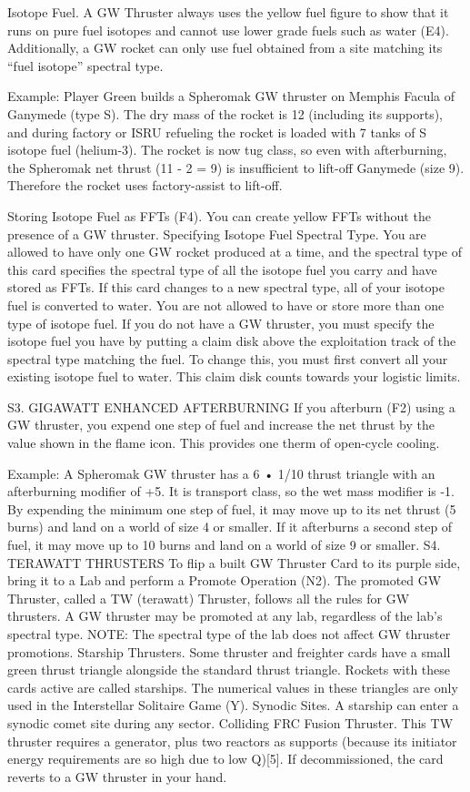 \documentclass[a4paper]{book}
\begin{document}
Isotope Fuel. A GW Thruster always uses the yellow fuel figure to show that it runs on pure fuel isotopes and cannot use lower grade fuels such as water (E4). Additionally, a GW rocket can only use fuel obtained from a site matching its “fuel isotope” spectral type.

Example: Player Green builds a Spheromak GW thruster on Memphis Facula of Ganymede (type S). The dry mass of the rocket is 12 (including its supports), and during factory or ISRU refueling the rocket is loaded with 7 tanks of S isotope fuel (helium-3). The rocket is now tug class, so even with afterburning, the Spheromak net thrust (11 - 2 = 9) is insufficient to lift-off Ganymede (size 9). Therefore the rocket uses factory-assist to lift-off.

 Storing Isotope Fuel as FFTs  (F4). You can create yellow FFTs without the presence of a GW thruster.
Specifying Isotope Fuel Spectral Type. You are allowed to have only one GW rocket produced at a time, and the spectral type of this card specifies the spectral type of all the isotope fuel you carry and have stored as FFTs. If this card changes to a new spectral type, all of your isotope fuel is converted to water. You are not allowed to have or store more than one type of isotope fuel. If you do not have a GW thruster, you must specify the isotope fuel you have by putting a claim disk above the exploitation track of the spectral type matching the fuel. To change this, you must first convert all your existing isotope fuel to water. This claim disk counts towards your logistic limits.
 
S3. GIGAWATT ENHANCED AFTERBURNING
If you afterburn (F2) using a GW thruster, you expend one step of fuel and increase the net thrust by the value shown in the flame icon. This provides one therm of open-cycle cooling.

Example: A Spheromak GW thruster has a 6 • 1/10 thrust triangle with an afterburning modifier of +5. It is transport class, so the wet mass modifier is -1. By expending the minimum one step of fuel, it may move up to its net thrust (5 burns) and land on a world of size 4 or smaller. If it afterburns a second step of fuel, it may move up to 10 burns and land on a world of size 9 or smaller.
S4. TERAWATT THRUSTERS
To flip a built GW Thruster Card to its purple side, bring it to a Lab and perform a Promote Operation (N2). The promoted GW Thruster, called a TW (terawatt) Thruster, follows all the rules for GW thrusters.
A GW thruster may be promoted at any lab, regardless of the lab’s spectral type.
NOTE: The spectral type of the lab does not affect GW thruster promotions.
Starship Thrusters. Some thruster and freighter cards have a small green thrust triangle alongside the standard thrust triangle. Rockets with these cards active are called starships. The numerical values in these triangles are only used in the Interstellar Solitaire Game (Y).
Synodic Sites. A starship can enter a synodic comet site during any sector.
Colliding FRC Fusion Thruster. This TW thruster requires a generator, plus two reactors as supports (because its initiator energy requirements are so high due to low Q)[5]. 
If decommissioned, the card reverts to a GW thruster in your hand.
\end{document}
